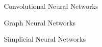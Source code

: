 \documentclass[../main.tex]{subfiles}
\begin{document}
    \begin{section}{Convolutional Neural Networks}
           
    \end{section}
    \begin{section}{Graph Neural Networks} 
            
    \end{section}
    \begin{section}{Simplicial Neural Networks}
            
    \end{section}
\end{document}
